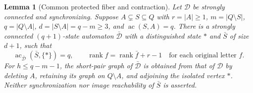 \documentclass[10pt]{article}
\newtheorem{lemma}[theorem]{Lemma}
\newcommand{\ac}{\operatorname{ac}}
\begin{document}
\begin{lemma}[Common protected fiber and contraction]\label{lem:protected-contraction}
Let $\mathcal D$ be strongly connected and synchronizing. Suppose
$A\subsetneq S\subseteq Q$ with $r=|A|\ge1$, $m=|Q\setminus S|$,
$q=|Q\setminus A|$, $d=|S\setminus A|=q-m\ge3$, and
$\ac(S,A)=q$. There is a strongly connected $(q+1)$-state
automaton $\bar{\mathcal D}$ with a distinguished state $*$ and
$\bar S$ of size $d+1$, such that
\[
 \ac_{\bar{\mathcal D}}(\bar S,\{*\})=q,\qquad
 \operatorname{rank}f=\operatorname{rank}\bar f+r-1
 \quad\text{for each original letter }f.
\]
For $h\le q-m-1$, the short-pair graph of $\bar{\mathcal D}$ is obtained
from that of $\mathcal D$ by deleting $A$, retaining its graph on
$Q\setminus A$, and adjoining the isolated vertex $*$.
Neither synchronization nor image reachability of $\bar S$ is asserted.
\end{lemma}
\end{document}
